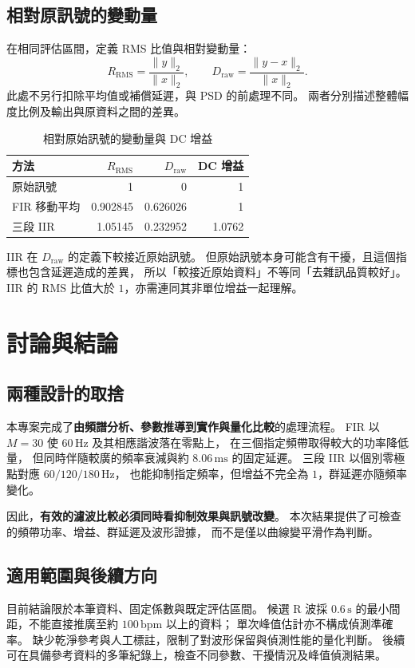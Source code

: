 \documentclass[11pt,a4paper,fontset=none,scheme=plain]{ctexart}
\newcommand{\Hz}{\,\mathrm{Hz}}
\newcommand{\s}{\,\mathrm{s}}
\newcommand{\ms}{\,\mathrm{ms}}
\begin{document}
\clearpage
\subsection{相對原訊號的變動量}
在相同評估區間，定義 RMS 比值與相對變動量：
\begin{equation}
R_{\mathrm{RMS}}=\frac{\|y\|_2}{\|x\|_2},
\qquad D_{\mathrm{raw}}=\frac{\|y-x\|_2}{\|x\|_2}.
\label{eq:change}
\end{equation}
此處不另行扣除平均值或補償延遲，與 PSD 的前處理不同。
兩者分別描述整體幅度比例及輸出與原資料之間的差異。

\begin{table}[H]\centering
\caption{相對原始訊號的變動量與 DC 增益\cite{run2026}}\label{tab:change}
\begin{tabular}{@{}lrrr@{}}
\toprule
方法 & $R_{\mathrm{RMS}}$ & $D_{\mathrm{raw}}$ & DC 增益\\ \midrule
原始訊號 & 1 & 0 & 1\\
FIR 移動平均 & 0.902845 & 0.626026 & 1\\
三段 IIR & 1.05145 & 0.232952 & 1.0762\\
\bottomrule
\end{tabular}
\end{table}

IIR 在 $D_{\mathrm{raw}}$ 的定義下較接近原始訊號。
但原始訊號本身可能含有干擾，且這個指標也包含延遲造成的差異，
所以「較接近原始資料」不等同「去雜訊品質較好」。
IIR 的 RMS 比值大於 $1$，亦需連同其非單位增益一起理解。

\section{討論與結論}
\subsection{兩種設計的取捨}
本專案完成了\textbf{由頻譜分析、參數推導到實作與量化比較}的處理流程。
FIR 以 $M=30$ 使 $60\Hz$ 及其相應諧波落在零點上，
在三個指定頻帶取得較大的功率降低量，
但同時伴隨較廣的頻率衰減與約 $8.06\ms$ 的固定延遲。
三段 IIR 以個別零極點對應 $60/120/180\Hz$，
也能抑制指定頻率，但增益不完全為 $1$，群延遲亦隨頻率變化。

因此，\textbf{有效的濾波比較必須同時看抑制效果與訊號改變}。
本次結果提供了可檢查的頻帶功率、增益、群延遲及波形證據，
而不是僅以曲線變平滑作為判斷。

\subsection{適用範圍與後續方向}
目前結論限於本筆資料、固定係數與既定評估區間。
候選 R 波採 $0.6\s$ 的最小間距，不能直接推廣至約 $100\,\mathrm{bpm}$ 以上的資料；
單次峰值估計亦不構成偵測準確率。
缺少乾淨參考與人工標註，限制了對波形保留與偵測性能的量化判斷。
後續可在具備參考資料的多筆紀錄上，檢查不同參數、干擾情況及峰值偵測結果。
\end{document}
